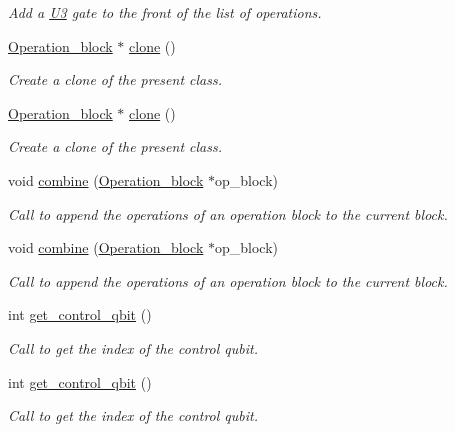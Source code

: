 \begin{DoxyCompactItemize}
\begin{DoxyCompactList}\small\item\em Add a \hyperlink{class_u3}{U3} gate to the front of the list of operations. \end{DoxyCompactList}\item 
\hyperlink{class_operation__block}{Operation\+\_\+block} $\ast$ \hyperlink{class_operation__block_a2aa75d20b21c3b5802730c0abe54db5e}{clone} ()
\begin{DoxyCompactList}\small\item\em Create a clone of the present class. \end{DoxyCompactList}\item 
\hyperlink{class_operation__block}{Operation\+\_\+block} $\ast$ \hyperlink{class_operation__block_af5d1f81be3a54eada1de293d1e9877c5}{clone} ()
\begin{DoxyCompactList}\small\item\em Create a clone of the present class. \end{DoxyCompactList}\item 
void \hyperlink{class_operation__block_a60062cf6f48ebfdcaae9db3367a66147}{combine} (\hyperlink{class_operation__block}{Operation\+\_\+block} $\ast$op\+\_\+block)
\begin{DoxyCompactList}\small\item\em Call to append the operations of an operation block to the current block. \end{DoxyCompactList}\item 
void \hyperlink{class_operation__block_a60062cf6f48ebfdcaae9db3367a66147}{combine} (\hyperlink{class_operation__block}{Operation\+\_\+block} $\ast$op\+\_\+block)
\begin{DoxyCompactList}\small\item\em Call to append the operations of an operation block to the current block. \end{DoxyCompactList}\item 
int \hyperlink{class_operation_a2e9b60d334a0e0c99dede014ac989d0a}{get\+\_\+control\+\_\+qbit} ()
\begin{DoxyCompactList}\small\item\em Call to get the index of the control qubit. \end{DoxyCompactList}\item 
int \hyperlink{class_operation_a2e9b60d334a0e0c99dede014ac989d0a}{get\+\_\+control\+\_\+qbit} ()
\begin{DoxyCompactList}\small\item\em Call to get the index of the control qubit. \end{DoxyCompactList}\item 

\end{DoxyCompactItemize}
